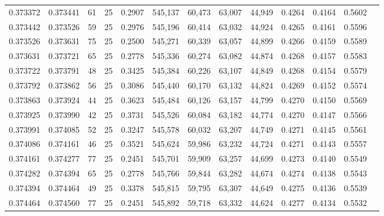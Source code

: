 \begin{tabular}{rrrrrrrrrrrrr}
0.373372 & 0.373441 &    61 &  25 &                                     0.2907 & 545,137 &  60,473 &  63,007 &  44,949 & 0.4264 & 0.4164 & 0.5602 \\
0.373442 & 0.373526 &    59 &  25 &                                     0.2976 & 545,196 &  60,414 &  63,032 &  44,924 & 0.4265 & 0.4161 & 0.5596 \\
0.373526 & 0.373631 &    75 &  25 &                                     0.2500 & 545,271 &  60,339 &  63,057 &  44,899 & 0.4266 & 0.4159 & 0.5589 \\
0.373631 & 0.373721 &    65 &  25 &                                     0.2778 & 545,336 &  60,274 &  63,082 &  44,874 & 0.4268 & 0.4157 & 0.5583 \\
0.373722 & 0.373791 &    48 &  25 &                                     0.3425 & 545,384 &  60,226 &  63,107 &  44,849 & 0.4268 & 0.4154 & 0.5579 \\
0.373792 & 0.373862 &    56 &  25 &                                     0.3086 & 545,440 &  60,170 &  63,132 &  44,824 & 0.4269 & 0.4152 & 0.5574 \\
0.373863 & 0.373924 &    44 &  25 &                                     0.3623 & 545,484 &  60,126 &  63,157 &  44,799 & 0.4270 & 0.4150 & 0.5569 \\
0.373925 & 0.373990 &    42 &  25 &                                     0.3731 & 545,526 &  60,084 &  63,182 &  44,774 & 0.4270 & 0.4147 & 0.5566 \\
0.373991 & 0.374085 &    52 &  25 &                                     0.3247 & 545,578 &  60,032 &  63,207 &  44,749 & 0.4271 & 0.4145 & 0.5561 \\
0.374086 & 0.374161 &    46 &  25 &                                     0.3521 & 545,624 &  59,986 &  63,232 &  44,724 & 0.4271 & 0.4143 & 0.5557 \\
0.374161 & 0.374277 &    77 &  25 &                                     0.2451 & 545,701 &  59,909 &  63,257 &  44,699 & 0.4273 & 0.4140 & 0.5549 \\
0.374282 & 0.374394 &    65 &  25 &                                     0.2778 & 545,766 &  59,844 &  63,282 &  44,674 & 0.4274 & 0.4138 & 0.5543 \\
0.374394 & 0.374464 &    49 &  25 &                                     0.3378 & 545,815 &  59,795 &  63,307 &  44,649 & 0.4275 & 0.4136 & 0.5539 \\
0.374464 & 0.374560 &    77 &  25 &                                     0.2451 & 545,892 &  59,718 &  63,332 &  44,624 & 0.4277 & 0.4134 & 0.5532 \\

\end{tabular}
